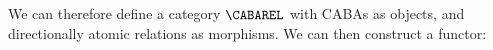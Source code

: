 \documentclass[10pt,a4paper]{article}
\newtheorem{lemma}[theorem]{Lemma}
\newtheorem{corollary}[theorem]{Corollary}
\begin{document}
We can therefore define a category \(\CABAREL\) with CABAs as objects, and
directionally atomic relations as morphisms. We can then construct a functor:

%
%
%
%   
\end{document}
